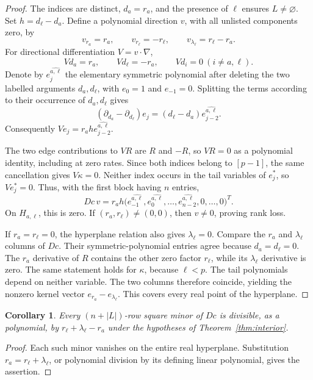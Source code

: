 \documentclass[11pt]{article}
\newtheorem{corollary}[theorem]{Corollary}
\begin{document}
\begin{proof}
The indices are distinct, \(d_a=r_a\), and the presence of \(\ell\) ensures \(L\ne\varnothing\). Set \(h=d_\ell-d_a\). Define a polynomial direction \(v\), with all unlisted components zero, by
\begin{equation}\label{eq:direction}
 v_{r_a}=r_a,\qquad v_{r_\ell}=-r_\ell,\qquad
 v_{\lambda_\ell}=r_\ell-r_a.
\end{equation}
For directional differentiation \(V=v\cdot\nabla\),
\[
 Vd_a=r_a,\qquad Vd_\ell=-r_a,\qquad Vd_i=0\ (i\ne a,\ell).
\]
Denote by \(e_j^{\widehat{a,\ell}}\) the elementary symmetric polynomial after deleting the two labelled arguments \(d_a,d_\ell\), with \(e_0=1\) and \(e_{-1}=0\). Splitting the terms according to their occurrence of \(d_a,d_\ell\) gives
\[
 (\partial_{d_a}-\partial_{d_\ell})e_j
       =(d_\ell-d_a)e_{j-2}^{\widehat{a,\ell}}.
\]
Consequently \(Ve_j=r_a h e_{j-2}^{\widehat{a,\ell}}\).

The two edge contributions to \(VR\) are \(R\) and \(-R\), so \(VR=0\) as a polynomial identity, including at zero rates. Since both indices belong to \([p-1]\), the same cancellation gives \(V\kappa=0\). Neither index occurs in the tail variables of \(e_j^*\), so \(Ve_j^*=0\). Thus, with the first block having \(n\) entries,
\begin{equation}\label{eq:kernel}
 Dc\,v=r_a h
  \bigl(e_{-1}^{\widehat{a,\ell}},e_0^{\widehat{a,\ell}},
       \ldots,e_{n-2}^{\widehat{a,\ell}},0,\ldots,0\bigr)^T.
\end{equation}
On \(H_{a,\ell}\), this is zero. If \((r_a,r_\ell)\ne(0,0)\), then \(v\ne0\), proving rank loss.

If \(r_a=r_\ell=0\), the hyperplane relation also gives \(\lambda_\ell=0\). Compare the \(r_a\) and \(\lambda_\ell\) columns of \(Dc\). Their symmetric-polynomial entries agree because \(d_a=d_\ell=0\). The \(r_a\) derivative of \(R\) contains the other zero factor \(r_\ell\), while its \(\lambda_\ell\) derivative is zero. The same statement holds for \(\kappa\), because \(\ell<p\). The tail polynomials depend on neither variable. The two columns therefore coincide, yielding the nonzero kernel vector \(e_{r_a}-e_{\lambda_\ell}\). This covers every real point of the hyperplane.
\end{proof}

\begin{corollary}\label{cor:minors}
Every \((n+|L|)\)-row square minor of \(Dc\) is divisible, as a polynomial, by \(r_\ell+\lambda_\ell-r_a\) under the hypotheses of Theorem~\ref{thm:interior}.
\end{corollary}
\begin{proof}
Each such minor vanishes on the entire real hyperplane. Substitution \(r_a=r_\ell+\lambda_\ell\), or polynomial division by its defining linear polynomial, gives the assertion.
\end{proof}
\end{document}
